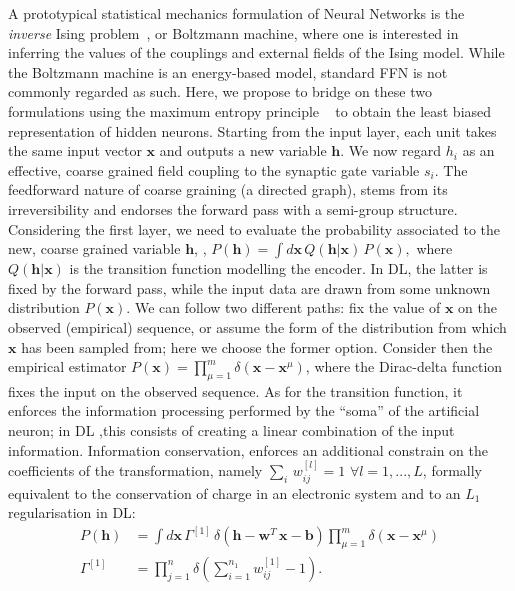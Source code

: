 \documentclass{article}
\begin{document}
A prototypical statistical mechanics formulation of Neural Networks is the {\it inverse} Ising problem~\cite{zecchina}, or Boltzmann machine, where one is interested in inferring the values of the couplings and external fields of the Ising model.  While the Boltzmann machine is an energy-based model, standard FFN is not commonly regarded as such. Here, we propose to bridge on these two formulations using the maximum entropy principle ~\cite{zecchina, roberto, mckay, jaynes} to obtain the least biased representation of hidden neurons. Starting from the input layer, each unit takes the same input vector $\mathbf{x}$ and outputs a new variable $\mathbf{h}$. We now regard $h_i$ as an effective, coarse grained field coupling to the synaptic gate variable $s_i$. The feedforward nature of coarse graining (a directed graph), stems from its irreversibility and endorses the forward pass with a semi-group structure. Considering the first layer, we need to evaluate the probability associated to the new, coarse grained variable $\mathbf{h}$, , $P(\mathbf{h}) =  \int d \mathbf{x} \, Q(\mathbf{h} | \mathbf{x} ) \, P(\mathbf{x}),$
%
%
where  $Q(\mathbf{h} | \mathbf{x} )$ is the transition function modelling the encoder. In DL, the latter is fixed by the forward pass, while the input data are drawn from some unknown distribution $P(\mathbf{x})$. We can follow two different paths: fix the value of $\mathbf{x}$ on the observed (empirical) sequence, or assume the form of the distribution from which $\mathbf{x}$ has been sampled from; here we choose the former option. Consider then the empirical estimator $P(\mathbf{x}) =  \prod_{\mu=1}^m  \delta( \mathbf{x} - \mathbf{x}^{\mu} )$, where the Dirac-delta function  fixes the input on the observed sequence. As for the transition function, it enforces the information processing performed by the ``soma'' of the artificial neuron; in  DL ,this consists of creating a linear combination of the input information. Information conservation, enforces an additional constrain on the coefficients of the transformation, namely $\sum_i \, w_{ij}^{[l]} =1$ $\forall l = 1, ..., L$, formally equivalent to the conservation of charge in an electronic system and to an $L_1$ regularisation in DL:
%
\begin{align} \label{eq:ps2}
P(\mathbf{h}) &= \int {d\mathbf{x}} \, \Gamma^{[1]} \, \delta\left( \mathbf{h} -  \mathbf{w}^{T} \, \mathbf{x} - \mathbf{b} \right) \prod_{\mu =1}^m  \delta ( \mathbf{x} - \mathbf{x}^{\mu} )  \\ \nonumber
\Gamma^{[1]} &= \prod_{j=1}^n \delta\left( \sum_{i=1}^{n_1} w_{ij}^{[1]} -1 \right) .
\end{align}
\end{document}
